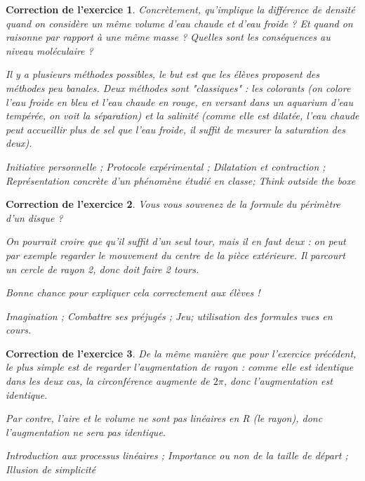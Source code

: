\documentclass[12pt]{article}
\theoremstyle{break}
\newtheorem{cor}{Correction de l'exercice}
\begin{document}
\begin{cor}
\textit{Concrètement, qu'implique la différence de densité quand on considère un même volume d'eau chaude et d'eau froide ? Et quand on raisonne par rapport à une même masse ? Quelles sont les conséquences au niveau moléculaire ?}

Il y a plusieurs méthodes possibles, le but est que les élèves proposent des méthodes peu banales. Deux méthodes sont "classiques" : les colorants (on colore l'eau froide en bleu et l'eau chaude en rouge, en versant dans un aquarium d'eau tempérée, on voit la séparation) et la salinité (comme elle est dilatée, l'eau chaude peut accueillir plus de sel que l'eau froide, il suffit de mesurer la saturation des deux).

\textit{Initiative personnelle ; Protocole expérimental ; Dilatation et contraction ; Représentation concrète d'un phénomène étudié en classe; Think outside the boxe}
\end{cor}


\begin{cor}
\textit{Vous vous souvenez de la formule du périmètre d'un disque ?}

On pourrait croire que qu'il suffit d'un seul tour, mais il en faut deux : on peut par exemple regarder le mouvement du centre de la pièce extérieure. Il parcourt un cercle de rayon 2, donc doit faire 2 tours.

Bonne chance pour expliquer cela correctement aux élèves !\newline 

\textit{Imagination ; Combattre ses préjugés ; Jeu; utilisation des formules vues en cours.}
\end{cor}


\begin{cor}
De la même manière que pour l'exercice précédent, le plus simple est de regarder l'augmentation de rayon : comme elle est identique dans les deux cas, la circonférence augmente de $2\pi$, donc l'augmentation est identique.

Par contre, l'aire et le volume ne sont pas linéaires en R (le rayon), donc l'augmentation ne sera pas identique.\newline 

\textit{Introduction aux processus linéaires ; Importance ou non de la taille de départ ; Illusion de simplicité}
\end{cor}
\end{document}
